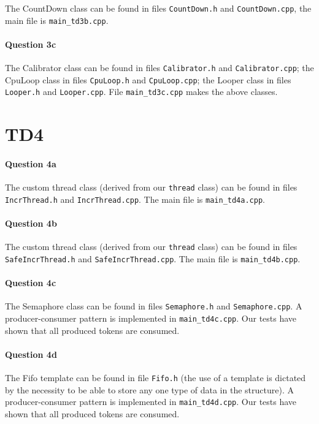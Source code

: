 \documentclass[a4paper,oneside,11pt]{article}
\begin{document}
The CountDown class can be found in files \texttt{CountDown.h} and \texttt{CountDown.cpp}, the main file is \texttt{main\_td3b.cpp}.

\paragraph{Question 3c} The Calibrator class can be found in files \texttt{Calibrator.h} and \texttt{Calibrator.cpp}; the CpuLoop class in files \texttt{CpuLoop.h} and \texttt{CpuLoop.cpp}; the Looper class in files \texttt{Looper.h} and \texttt{Looper.cpp}. File \texttt{main\_td3c.cpp} makes the above classes.

\section*{TD4}
\paragraph{Question 4a} The custom thread class (derived from our \texttt{thread} class) can be found in files \texttt{IncrThread.h} and \texttt{IncrThread.cpp}. The main file is \texttt{main\_td4a.cpp}.

\paragraph{Question 4b} The custom thread class (derived from our \texttt{thread} class) can be found in files \texttt{SafeIncrThread.h} and \texttt{SafeIncrThread.cpp}. The main file is \texttt{main\_td4b.cpp}.

\paragraph{Question 4c} The Semaphore class can be found in files \texttt{Semaphore.h} and \texttt{Semaphore.cpp}. A producer-consumer pattern is implemented in \texttt{main\_td4c.cpp}. Our tests have shown that all produced tokens are consumed.

\paragraph{Question 4d} The Fifo template can be found in file \texttt{Fifo.h} (the use of a template is dictated by the necessity to be able to store any one type of data in the structure). A producer-consumer pattern is implemented in \texttt{main\_td4d.cpp}. Our tests have shown that all produced tokens are consumed.
\end{document}
